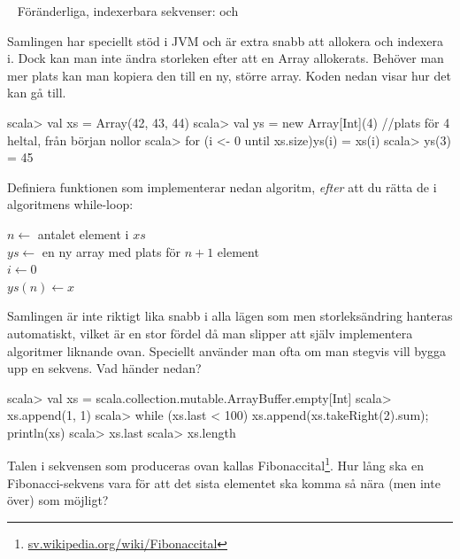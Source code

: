 \QUESTBEGIN

\Task  \what~ Föränderliga, indexerbara sekvenser:  och 

\Subtask Samlingen  har speciellt stöd i JVM och är extra snabb att allokera och indexera i. Dock kan man inte ändra storleken efter att en Array allokerats. Behöver man mer plats kan man kopiera den till en ny, större array. Koden nedan visar hur det kan gå till.
\begin{REPL}
scala> val xs = Array(42, 43, 44)
scala> val ys = new Array[Int](4)  //plats för 4 heltal, från början nollor
scala> for (i <- 0 until xs.size){ys(i) = xs(i)}
scala> ys(3) = 45
\end{REPL}
Definiera funktionen  som implementerar nedan algoritm, \emph{efter} att du rätta de \textbf{\color{red}{två buggarna}} i algoritmens while-loop:

\begin{algorithm}[H]

 $n \leftarrow$ antalet element i $xs$ \\
 $ys \leftarrow$ en ny array med plats för $n + 1$ element\\
 $i \leftarrow 0$  \\
 $ys(n) \leftarrow x$
\end{algorithm}



\Subtask Samlingen  är inte riktigt lika snabb i alla lägen som  men storleksändring hanteras automatiskt, vilket är en stor fördel då man slipper att själv implementera algoritmer liknande  ovan. Speciellt använder man ofta  om man stegvis vill bygga upp en sekvens. Vad händer nedan?
\begin{REPL}
scala> val xs = scala.collection.mutable.ArrayBuffer.empty[Int]
scala> xs.append(1, 1)
scala> while (xs.last < 100) {xs.append(xs.takeRight(2).sum); println(xs)}
scala> xs.last
scala> xs.length
\end{REPL}

\Subtask Talen i sekvensen som produceras ovan kallas Fibonaccital\footnote{\href{https://sv.wikipedia.org/wiki/Fibonaccital}{sv.wikipedia.org/wiki/Fibonaccital}}. Hur lång ska en Fibonacci-sekvens vara för att det sista elementet ska komma så nära (men inte över)  som möjligt?



